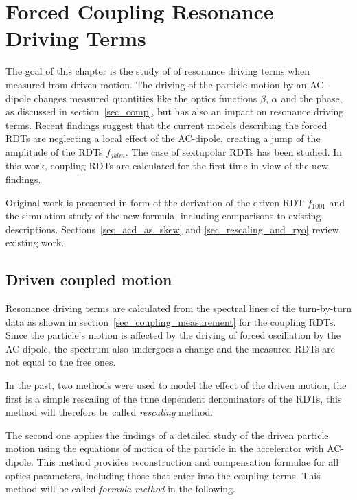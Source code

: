 \chapter{Forced Coupling Resonance Driving Terms} 
 \label{ch_forced_coupling}

\begin{chapterinfo}
    The goal of this chapter is the study of of resonance driving terms when measured from driven motion.
    The driving of the particle motion by an AC-dipole changes measured quantities like the optics functions $\beta$, $\alpha$
    and the phase, as discussed in section~\ref{sec_comp}, but has also an impact on resonance driving terms. 
    Recent findings suggest that the current models describing the forced RDTs are neglecting a local effect
    of the AC-dipole, creating a jump of the amplitude of the RDTs $f_{jklm}$. The case of sextupolar RDTs has been studied.
    In this work, coupling RDTs are calculated for the first time in view of the new findings.
    
    Original work is presented in form of the derivation of the driven RDT $f_{1001}$ and the simulation study
    of the new formula, including comparisons to existing descriptions.
    Sections~\ref{sec_acd_as_skew} and \ref{sec_rescaling_and_ryo} review existing work.
\end{chapterinfo}

\section{Driven coupled motion}
Resonance driving terms are calculated from the spectral lines of the turn-by-turn data as shown in
section~\ref{sec_coupling_measurement} for the coupling RDTs. Since the particle's motion is affected
by the driving of forced oscillation by the AC-dipole, the spectrum also undergoes a change and the
measured RDTs are not equal to the free ones.

In the past, two methods were used to model the effect of the driven motion, the first is a simple
rescaling of the tune dependent denominators of the RDTs, this method will therefore be called \emph{rescaling} method.

The second one \cite{Miyamoto2010} applies the findings of a detailed study of the driven particle motion using the equations of motion of the particle in the accelerator with AC-dipole.
This method provides reconstruction and compensation formulae for all optics parameters,
including those that enter into the coupling terms. This method will be called \emph{formula method} in the following.

